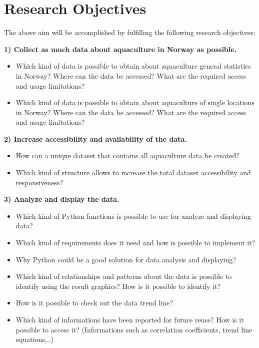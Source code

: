 \section{Research Objectives}
\vspace{-5mm}
The above aim will be accomplished by fulfilling the following research objectives:

\textbf{1) Collect as much data about aquaculture in Norway as possible.}
\vspace{-5mm}
\begin{itemize}
 \setlength{\itemsep}{-5pt}
  \item Which kind of data is possible to obtain about aquaculture general statistics in Norway? Where can the data be accessed? What are the required access and usage limitations?
  \item Which kind of data is possible to obtain about aquaculture of single locations in Norway? Where can the data be accessed? What are the required access and usage limitations?
\end{itemize}

 
\textbf{2) Increase accessibility and availability of the data.}
\vspace{-5mm}
\begin{itemize}
 \setlength{\itemsep}{-5pt}
  \item How can a unique dataset that contains all aquaculture data be created?
  \item Which kind of structure allows to increase the total dataset accessibility and responsiveness?
\end{itemize}
 
\textbf{3) Analyze and display the data.}
\vspace{-5mm}
\begin{itemize}
 \setlength{\itemsep}{-5pt}
  \item Which kind of Python functions is possible to use for analyze and displaying data? 
  \item Which kind of requirements does it need and how is possible to implement it?
  \item Why Python could be a good solution for data analysis and displaying? 
  \item Which kind of relationships and patterns about the data is possible to identify using the result graphics? How is it possible to identify it?
  \item How is it possible to check out the data trend line? 
  \item Which kind of informations have been reported for future reuse? How is it possible to access it? (Informations such as correlation coefficients, trend line equations,..)
 \end{itemize}

